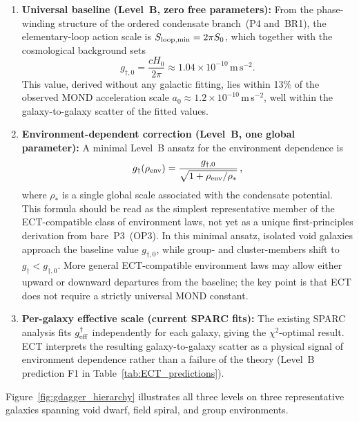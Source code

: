 \documentclass[11pt,a4paper]{article}
\numberwithin{equation}{section}
\begin{document}
\begin{enumerate}[label=(\arabic*)]

\item \textbf{Universal baseline (Level~B, zero free parameters):}
  From the phase-winding structure of the ordered condensate
  branch~(P4 and~BR1), the elementary-loop action scale is
  $S_{\rm loop,min}=2\pi S_0$, which together with the cosmological
  background sets
  \begin{equation}
    g_{\dagger,0} = \frac{cH_0}{2\pi} \approx 1.04\times10^{-10}\,\mathrm{m\,s^{-2}}.
    \label{eq:gdag_baseline}
  \end{equation}
  This value, derived without any galactic fitting, lies within 13\%
  of the observed MOND acceleration scale $a_0\approx1.2\times10^{-10}$\,m\,s$^{-2}$,
  well within the galaxy-to-galaxy scatter of the fitted values.

\item \textbf{Environment-dependent correction (Level~B, one global parameter):}
  A minimal Level~B ansatz for the environment dependence is
  \begin{equation}
    g_\dagger(\rho_{\rm env})
    = \frac{g_{\dagger,0}}{\sqrt{1+\rho_{\rm env}/\rho_*}}\,,
    \label{eq:gdag_env}
  \end{equation}
  where $\rho_*$ is a single global scale associated with the
  condensate potential.  This formula should be read as the
  simplest representative member of the ECT-compatible class of
  environment laws, not yet as a unique first-principles derivation
  from bare~P3~(OP3).
  In this minimal ansatz, isolated void galaxies approach the
  baseline value $g_{\dagger,0}$, while group- and cluster-members
  shift to $g_\dagger<g_{\dagger,0}$.  More general ECT-compatible
  environment laws may allow either upward or downward departures
  from the baseline; the key point is that ECT does not require a
  strictly universal MOND constant.

\item \textbf{Per-galaxy effective scale (current SPARC fits):}
  The existing SPARC analysis fits $g^\dagger_{\rm eff}$ independently
  for each galaxy, giving the $\chi^2$-optimal result.
  ECT interprets the resulting galaxy-to-galaxy scatter as a physical
  signal of environment dependence rather than a failure of the theory
  (Level~B prediction F1 in Table~\ref{tab:ECT_predictions}).

\end{enumerate}

Figure~\ref{fig:gdagger_hierarchy} illustrates all three levels on three
representative galaxies spanning void dwarf, field spiral, and group
environments.
\end{document}
